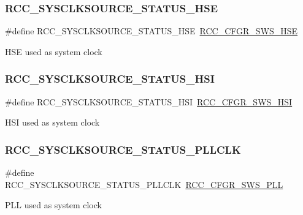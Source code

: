 \subsubsection{\texorpdfstring{RCC\_SYSCLKSOURCE\_STATUS\_HSE}{RCC\_SYSCLKSOURCE\_STATUS\_HSE}}
{\footnotesize\ttfamily \#define R\+C\+C\+\_\+\+S\+Y\+S\+C\+L\+K\+S\+O\+U\+R\+C\+E\+\_\+\+S\+T\+A\+T\+U\+S\+\_\+\+H\+SE~\mbox{\hyperlink{group___peripheral___registers___bits___definition_gae09a0202f441c1a43e69c62331d50a08}{R\+C\+C\+\_\+\+C\+F\+G\+R\+\_\+\+S\+W\+S\+\_\+\+H\+SE}}}

H\+SE used as system clock \mbox{\label{group___r_c_c___system___clock___source___status_ga0d6c2b0b2d59e6591295649853bb2abd}} 
\subsubsection{\texorpdfstring{RCC\_SYSCLKSOURCE\_STATUS\_HSI}{RCC\_SYSCLKSOURCE\_STATUS\_HSI}}
{\footnotesize\ttfamily \#define R\+C\+C\+\_\+\+S\+Y\+S\+C\+L\+K\+S\+O\+U\+R\+C\+E\+\_\+\+S\+T\+A\+T\+U\+S\+\_\+\+H\+SI~\mbox{\hyperlink{group___peripheral___registers___bits___definition_ga6764639cf221e1ebc0b5448dcaed590a}{R\+C\+C\+\_\+\+C\+F\+G\+R\+\_\+\+S\+W\+S\+\_\+\+H\+SI}}}

H\+SI used as system clock \mbox{\label{group___r_c_c___system___clock___source___status_ga4f05019ec09da478d084f44dbaad7d6d}} 
\subsubsection{\texorpdfstring{RCC\_SYSCLKSOURCE\_STATUS\_PLLCLK}{RCC\_SYSCLKSOURCE\_STATUS\_PLLCLK}}
{\footnotesize\ttfamily \#define R\+C\+C\+\_\+\+S\+Y\+S\+C\+L\+K\+S\+O\+U\+R\+C\+E\+\_\+\+S\+T\+A\+T\+U\+S\+\_\+\+P\+L\+L\+C\+LK~\mbox{\hyperlink{group___peripheral___registers___bits___definition_ga2c67e2279804a83ef24438267d9d4a6c}{R\+C\+C\+\_\+\+C\+F\+G\+R\+\_\+\+S\+W\+S\+\_\+\+P\+LL}}}

P\+LL used as system clock 